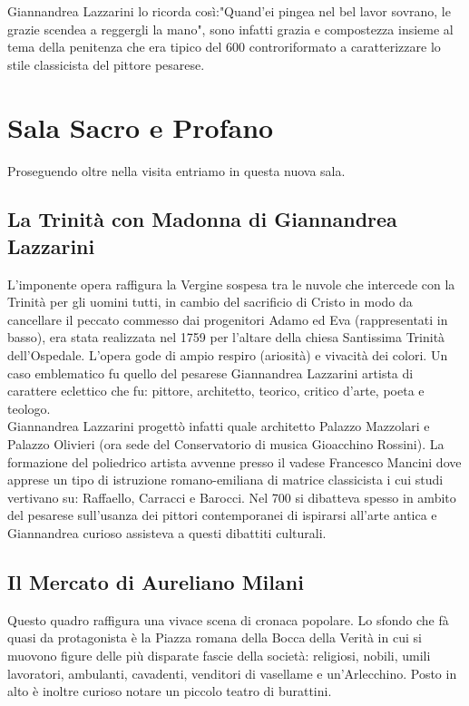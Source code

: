 \documentclass[hidelinks,12pt,a4paper]{article}
\begin{document}
\begin{flushleft}
			Giannandrea Lazzarini lo ricorda così:"Quand'ei pingea nel bel lavor sovrano, le grazie scendea a reggergli la mano", sono infatti grazia e compostezza insieme al tema della penitenza che era tipico del 600 controriformato a caratterizzare lo stile classicista del pittore pesarese.
	
			\section{Sala Sacro e Profano}
			Proseguendo oltre nella visita entriamo in questa nuova sala.
	
			\subsection{La Trinità con Madonna di Giannandrea Lazzarini}
			L'imponente opera raffigura la Vergine sospesa tra le nuvole che intercede con la Trinità per gli uomini tutti, in cambio del sacrificio di Cristo in modo da cancellare il peccato commesso dai progenitori Adamo ed Eva (rappresentati in basso), era stata realizzata nel 1759 per l'altare della chiesa Santissima Trinità dell'Ospedale. L'opera gode di ampio respiro (ariosità) e vivacità dei colori. Un caso emblematico fu quello del pesarese Giannandrea Lazzarini artista di carattere eclettico che fu: pittore, architetto, teorico, critico d'arte, poeta e teologo.\\
			Giannandrea Lazzarini progettò infatti quale architetto Palazzo Mazzolari e Palazzo Olivieri (ora sede del Conservatorio di musica Gioacchino Rossini). La formazione del poliedrico artista avvenne presso il vadese Francesco Mancini dove apprese un tipo di istruzione romano-emiliana di matrice classicista i cui studi vertivano su: Raffaello, Carracci e Barocci. Nel 700 si dibatteva spesso in ambito del pesarese sull'usanza dei pittori contemporanei di ispirarsi all'arte antica e Giannandrea curioso assisteva a questi dibattiti culturali.
	
			\subsection{Il Mercato di Aureliano Milani}
			Questo quadro raffigura una vivace scena di cronaca popolare. Lo sfondo che fà quasi da protagonista è la Piazza romana della Bocca della Verità in cui si muovono figure delle più disparate fascie della società: religiosi, nobili, umili lavoratori, ambulanti, cavadenti, venditori di vasellame e un'Arlecchino. Posto in alto è inoltre curioso notare un piccolo teatro di burattini.
	

\end{flushleft}
\end{document}
